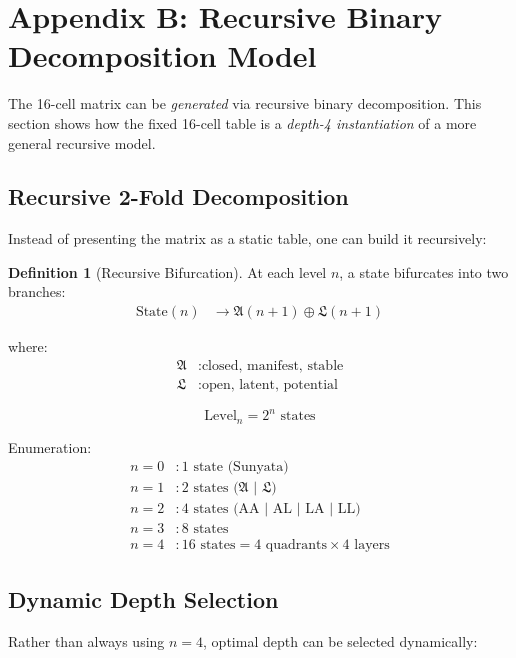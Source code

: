 \documentclass[12pt,a4paper]{article}
\theoremstyle{definition}
\newtheorem{definition}{Definition}[section]
\newcommand{\aletheia}{\mathfrak{A}}
\newcommand{\letheia}{\mathfrak{L}}
\begin{document}
\section*{Appendix B: Recursive Binary Decomposition Model}

The 16-cell matrix can be \textit{generated} via recursive binary decomposition. This section shows how the fixed 16-cell table is a \textit{depth-4 instantiation} of a more general recursive model.

\subsection{Recursive 2-Fold Decomposition}

Instead of presenting the matrix as a static table, one can build it recursively:

\begin{definition}[Recursive Bifurcation]
At each level $n$, a state bifurcates into two branches:
\begin{align}
\text{State}(n) &\to \aletheia(n+1) \oplus \letheia(n+1)
\end{align}

where:
\begin{align}
\aletheia &: \text{closed, manifest, stable} \\
\letheia &: \text{open, latent, potential}
\end{align}
\end{definition}

\begin{equation}
\text{Level}_n = 2^n \text{ states}
\end{equation}

Enumeration:
\begin{align}
n=0 &: 1 \text{ state (Sunyata)} \\
n=1 &: 2 \text{ states ($\aletheia$ | $\letheia$)} \\
n=2 &: 4 \text{ states (AA | AL | LA | LL)} \\
n=3 &: 8 \text{ states} \\
n=4 &: 16 \text{ states} = 4 \text{ quadrants} \times 4 \text{ layers}
\end{align}

\subsection{Dynamic Depth Selection}

Rather than always using $n=4$, optimal depth can be selected dynamically:
\end{document}
